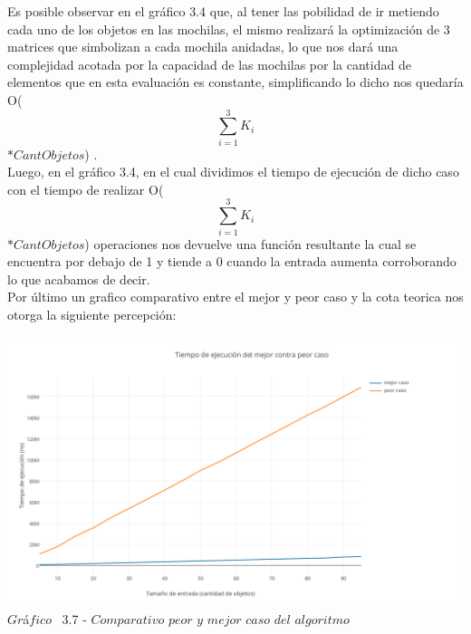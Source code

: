   
Es posible observar en el gr\'afico 3.4 que, al tener las pobilidad de ir metiendo cada uno de los objetos en las mochilas, el mismo realizar\'a la optimizaci\'on de 3 matrices que simbolizan a cada mochila anidadas, lo que nos dar\'a una complejidad acotada por la capacidad de las mochilas por la cantidad de elementos que en esta evaluaci\'on es constante, simplificando lo dicho nos quedar\'ia O(\[
\sum_{i=1}^{3}K_{i} 
\] $\ast CantObjetos$) .\\
Luego, en el gr\'afico 3.4, en el cual dividimos el tiempo de ejecuci\'on de dicho caso con el tiempo de realizar O(\[
\sum_{i=1}^{3}K_{i} 
\] $\ast CantObjetos$) operaciones nos devuelve una funci\'on resultante la cual se encuentra por debajo de 1 y tiende a 0 cuando la entrada aumenta corroborando lo que acabamos de decir.\\

Por \'ultimo un grafico comparativo entre el mejor y peor caso y la cota teorica nos otorga la siguiente percepci\'on:\\ 

\vspace*{0.3cm} \vspace*{0.3cm}
  \begin{center}
 \includegraphics[scale=0.65]{./EJ3/comparativo2.png}
 {$Gr$\'a$fico$ \ 3.7 - $Comparativo$ $peor$ $y$ $mejor$ $caso$ $del$ $algoritmo$}
  \end{center}
  \vspace*{0.3cm}


